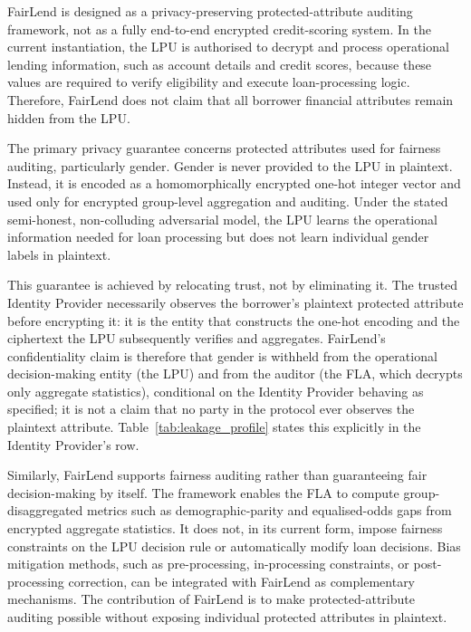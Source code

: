 \documentclass[a4paper,fleqn]{cas-dc}
\begin{document}
FairLend is designed as a privacy-preserving protected-attribute auditing framework, not as a fully end-to-end encrypted credit-scoring system. In the current instantiation, the LPU is authorised to decrypt and process operational lending information, such as account details and credit scores, because these values are required to verify eligibility and execute loan-processing logic. Therefore, FairLend does not claim that all borrower financial attributes remain hidden from the LPU.

The primary privacy guarantee concerns protected attributes used for fairness auditing, particularly gender. Gender is never provided to the LPU in plaintext. Instead, it is encoded as a homomorphically encrypted one-hot integer vector and used only for encrypted group-level aggregation and auditing. Under the stated semi-honest, non-colluding adversarial model, the LPU learns the operational information needed for loan processing but does not learn individual gender labels in plaintext.

This guarantee is achieved by relocating trust, not by eliminating it. The trusted Identity Provider necessarily observes the borrower's plaintext protected attribute before encrypting it: it is the entity that constructs the one-hot encoding and the ciphertext the LPU subsequently verifies and aggregates. FairLend's confidentiality claim is therefore that gender is withheld from the operational decision-making entity (the LPU) and from the auditor (the FLA, which decrypts only aggregate statistics), conditional on the Identity Provider behaving as specified; it is not a claim that no party in the protocol ever observes the plaintext attribute. Table~\ref{tab:leakage_profile} states this explicitly in the Identity Provider's row.

Similarly, FairLend supports fairness auditing rather than guaranteeing fair decision-making by itself. The framework enables the FLA to compute group-disaggregated metrics such as demographic-parity and equalised-odds gaps from encrypted aggregate statistics. It does not, in its current form, impose fairness constraints on the LPU decision rule or automatically modify loan decisions. Bias mitigation methods, such as pre-processing, in-processing constraints, or post-processing correction, can be integrated with FairLend as complementary mechanisms. The contribution of FairLend is to make protected-attribute auditing possible without exposing individual protected attributes in plaintext.

\color{black}
\end{document}
